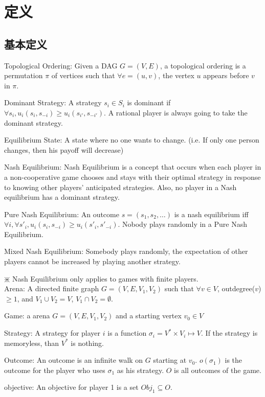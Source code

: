 \documentclass[12pt,a4paper]{ctexrep}
\begin{document}
\section{定义}
\subsection{基本定义}
Topological Ordering: Given a DAG $G = (V,E)$, a topological ordering is a permutation $\pi$ of vertices such that $\forall e = (u,v)$, the vertex $u$ appears before $v$ in $\pi$.

Dominant Strategy: A strategy $s_i \in S_i$ is dominant if $\forall s_i, u_i(s_i,s_{-i}) \geqslant u_i(s_{i'},s_{-i'})$. A rational player is always going to take the dominant strategy.

Equilibrium State: A state where no one wants to change. (i.e. If only one person changes, then his payoff will decrease)

Nash Equilibrium: Nash Equilibrium is a concept that occurs when each player in a non-cooperative game chooses and stays with their optimal strategy in response to knowing other players' anticipated strategies. Also, no player in a Nash equilibrium has a dominant strategy.

Pure Nash Equilibrium: An outcome $s = (s_1,s_2,\dots)$ is a nash equilibrium iff $\forall i, \forall s'_i, u_i(s_i,s_{-i}) \geqslant u_i(s'_i,s'_{-i})$. Nobody plays randomly in a Pure Nash Equilibrium.

Mixed Nash Equilibrium: Somebody plays randomly, the expectation of other players cannot be increased by playing another strategy.

$\divideontimes$ Nash Equilibrium only applies to games with finite players.\\

Arena: A directed finite graph $G = (V,E,V_1,V_2)$ such that $\forall v \in V$, outdegree($v$)$\geqslant 1$, and $V_1 \cup V_2 = V$, $V_1 \cap V_2 = \emptyset$.

Game: a arena $G = (V,E,V_1,V_2)$ and a starting vertex $v_0\in V$

Strategy: A strategy for player $i$ is a function $\sigma_i = V^* \times V_i \mapsto V$. If the strategy is memoryless, than $V^*$ is  nothing.

Outcome: An outcome is an infinite walk on $G$ starting at $v_0$. $o(\sigma_1)$ is the outcome for the player who uses $\sigma_1$ as his strategy. $O$ is all outcomes of the game.

objective: An objective for player 1 is a set $Obj_1 \subseteq O$.
\end{document}
